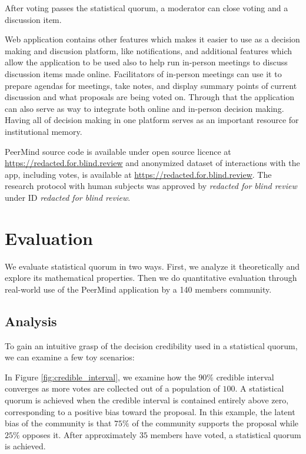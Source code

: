 \documentclass[format=acmsmall, review=true, screen=true, anonymous=true]{acmart}
\begin{document}
After voting passes the statistical quorum, a moderator can close voting and a discussion item.

Web application contains other features which makes it easier to use as a decision making and discusion
platform, like notifications, and additional features which allow the application to be used also to
help run in-person meetings to discuss discussion items made
online. Facilitators of in-person meetings can use it to prepare agendas for meetings, take notes,
and display summary points of current discussion and what proposals are being voted on. Through that the
application can also serve as way to integrate both online and in-person decision making. Having all of
decision making in one platform serves as an important resource for institutional memory.

PeerMind source code is available under open source licence at \url{https://redacted.for.blind.review} and
anonymized dataset of interactions with the app, including votes, is available at \url{https://redacted.for.blind.review}.
The research protocol with human subjects was approved by \emph{redacted for blind review} under
ID \emph{redacted for blind review}.

\section{Evaluation}
\label{sec:evaluation}

We evaluate statistical quorum in two ways. First, we analyze it theoretically and explore its mathematical properties.
Then we do quantitative
evaluation through real-world use of the PeerMind application by a 140 members
community.

\subsection{Analysis}


To gain an intuitive grasp of the decision credibility used in a statistical quorum, we can examine a few toy scenarios:

In Figure \ref{fig:credible_interval}, we examine how the $90\%$ credible interval converges as more votes are collected out of a population of $100$.  A statistical quorum is achieved when the credible interval is contained entirely above zero, corresponding to a positive bias toward the proposal.  In this example, the latent bias of the community is that $75\%$ of the community supports the proposal while $25\%$ opposes it.  After approximately $35$ members have voted, a statistical quorum is achieved.
\end{document}
